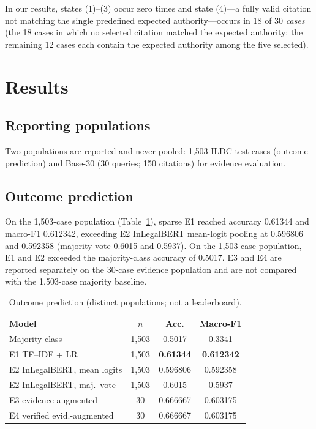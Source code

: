 \documentclass[conference]{IEEEtran}
\begin{document}
In our results, states (1)--(3) occur zero times and state (4)---a fully valid
citation not matching the single predefined expected authority---occurs in 18 of 30
\emph{cases} (the 18 cases in which no selected citation matched the expected authority;
the remaining 12 cases each contain the expected authority among the five selected).

\section{Results}
\label{sec:results}

\subsection{Reporting populations}

Two populations are reported and never pooled: 1{,}503
ILDC test cases (outcome prediction) and Base-30 (30 queries; 150 citations) for evidence evaluation.

\subsection{Outcome prediction}

On the 1{,}503-case population (Table~\ref{tab:outcome}), sparse E1 reached accuracy 0.61344 and macro-F1 0.612342,
exceeding E2 InLegalBERT mean-logit pooling at 0.596806 and 0.592358 (majority vote
0.6015 and 0.5937). On the 1{,}503-case population, E1 and E2 exceeded the majority-class accuracy of 0.5017. E3 and E4 are reported separately on the 30-case evidence population and are not compared with the 1{,}503-case majority baseline.

\begin{table}[t]
\caption{Outcome prediction (distinct populations; not a leaderboard).}
\label{tab:outcome}
\centering
\footnotesize
\setlength{\tabcolsep}{4pt}
\begin{tabular}{lccc}
\toprule
\textbf{Model} & \textbf{$n$} & \textbf{Acc.} & \textbf{Macro-F1} \\
\midrule
Majority class            & 1{,}503 & 0.5017 & 0.3341 \\
E1 TF--IDF + LR           & 1{,}503 & \textbf{0.61344} & \textbf{0.612342} \\
E2 InLegalBERT, mean logits & 1{,}503 & 0.596806 & 0.592358 \\
E2 InLegalBERT, maj.\ vote  & 1{,}503 & 0.6015 & 0.5937 \\
\midrule
E3 evidence-augmented     & 30 & 0.666667 & 0.603175 \\
E4 verified evid.-augmented & 30 & 0.666667 & 0.603175 \\
\bottomrule
\end{tabular}
\end{table}
\end{document}
